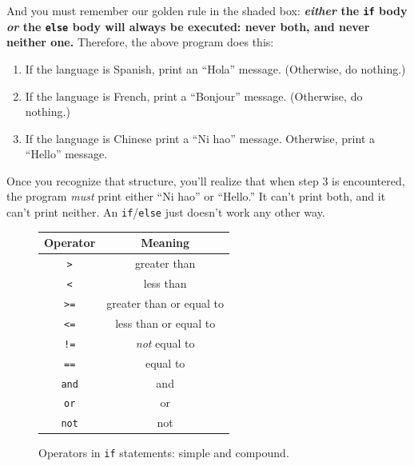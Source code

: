 
And you must remember our golden rule in the shaded box:
\textbf{\textit{either} the \texttt{if} body \textit{or} the \texttt{else} body
will always be executed: never both, and never neither one.} Therefore, the
above program does this:

\begin{samepage}
\begin{enumerate}[nosep]
\item If the language is Spanish, print an ``Hola'' message. (Otherwise, do
nothing.)
\item If the language is French, print a ``Bonjour'' message. (Otherwise, do
nothing.)
\item If the language is Chinese print a ``Ni hao'' message. Otherwise, print a
``Hello'' message.
\end{enumerate}
\end{samepage}

Once you recognize that structure, you'll realize that when step 3 is
encountered, the program \textit{must} print either ``Ni hao'' or ``Hello.'' It
can't print both, and it can't print neither. An \texttt{if}/\texttt{else} just
doesn't work any other way.

\begin{figure}[tb]
\centering
\small
\bigskip
\begingroup
\par\tagpdfparaOff
{}
\begin{tabular}{c|c}
Operator & Meaning \\
\hline
\texttt{>} & greater than \\
\hline
\texttt{<} & less than \\
\hline
\texttt{>=} & greater than or equal to \\
\hline
\texttt{<=} & less than or equal to \\
\hline
\texttt{!=} & \textit{not} equal to \\
\hline
\texttt{==} & equal to \\
\hline
\texttt{and} & and \\
\hline
\texttt{or} & or \\
\hline
\texttt{not} & not \\
\end{tabular}\par
\endgroup

\bigskip
\normalsize
\caption{Operators in \texttt{if} statements: simple and compound.}
\label{fig:ifStatementOps}
\end{figure}

